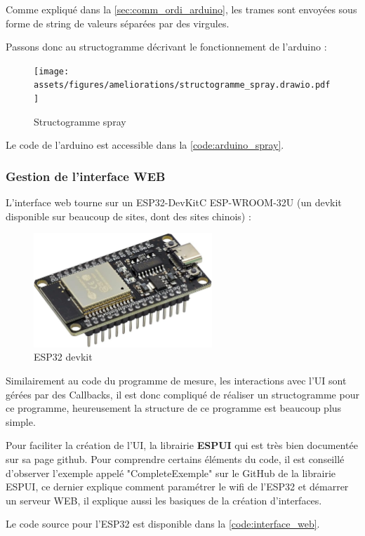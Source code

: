 Comme expliqué dans la \autoref{sec:comm_ordi_arduino}, les trames sont envoyées sous forme de string de valeurs séparées par des virgules.

Passons donc au structogramme décrivant le fonctionnement de l'arduino :
\begin{figure}[H]
    \centering
    \texttt{[image: assets/figures/ameliorations/structogramme\_spray.drawio.pdf]}
    \caption{Structogramme spray}
\end{figure}
Le code de l'arduino est accessible dans la \autoref{code:arduino_spray}.

\newpage
\subsubsection{Gestion de l'interface WEB}
L'interface web tourne sur un ESP32-DevKitC ESP-WROOM-32U (un devkit disponible sur beaucoup de sites, dont des sites chinois) :
\begin{figure}[H]
    \centering
    \includegraphics[page = 1, width = 0.6\textwidth]{assets/figures/ameliorations/ESP32_devkit.jpg}
    \caption{ESP32 devkit}
\end{figure}

Similairement au code du programme de mesure, les interactions avec l'UI sont gérées par des Callbacks, il est donc compliqué de réaliser un structogramme pour ce programme, heureusement la structure de ce programme est beaucoup
plus simple.

Pour faciliter la création de l'UI, la librairie \textbf{ESPUI}\cite{ESPUI}\footnotemark{} qui est très bien
documentée sur sa page github. Pour comprendre certains éléments du code, il est conseillé d'observer l'exemple appelé "CompleteExemple" sur le GitHub de la librairie ESPUI, ce dernier explique comment paramétrer le wifi de l'ESP32 et démarrer
un serveur WEB, il explique aussi les basiques de la création d'interfaces.

Le code source pour l'ESP32 est disponible dans la \autoref{code:interface_web}.

